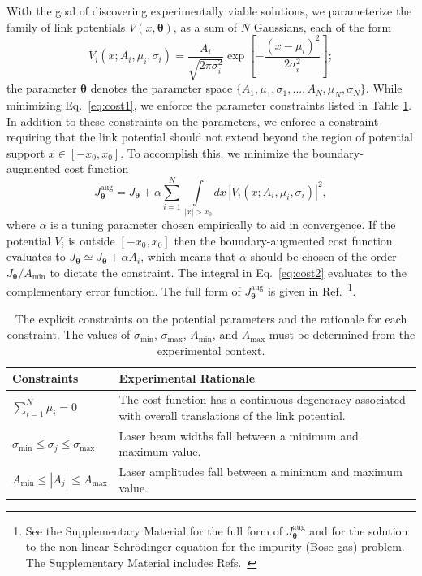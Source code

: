 \documentclass[twocolumn,amsmath,amssymb,showpacs,pra,superscriptaddress,aps]{revtex4-1}
\begin{document}
With the goal of discovering experimentally viable solutions, we parameterize the family of link potentials $V(x, \bm{\theta})$, as a sum of $N$ Gaussians, each of the form
\begin{equation}\label{eq:V-param}
V_i(x; A_i, \mu_i, \sigma_i) = \frac{A_i}{\sqrt{2\pi\sigma_i^2}}\exp\left[{-\frac{(x-\mu_i)^2}{2\sigma_i^2}}\right];
\end{equation}
the parameter $\bm{\theta}$ denotes the parameter space $\{A_1, \mu_1, \sigma_1,...,A_N, \mu_N, \sigma_N\}$. While minimizing Eq.~\eqref{eq:cost1}, we enforce the parameter constraints listed in Table \ref{tab:constraints}. In addition to these constraints on the parameters, we enforce a constraint requiring that the link potential should not extend beyond the region of potential support $x\in[-x_0,x_0]$. 
To accomplish this, we minimize the boundary-augmented cost function
\begin{equation}\label{eq:cost2}
  J_{\bm{\theta}}^{\mathrm{aug}} = J_{\bm{\theta}} + \alpha \sum_{i=1}^N\int\limits_{|x|>x_0}dx\,|V_i(x; A_i,\mu_i,\sigma_i)|^2,
\end{equation}
where $\alpha$ is a tuning parameter chosen empirically to aid in convergence. 
{\color{blue} If the potential $V_i$ is outside $[-x_0,x_0]$ then the boundary-augmented 
cost function evaluates to $J_{\bm{\theta}}\simeq J_{\bm{\theta}} +\alpha A_i$, which means that $\alpha$
should be chosen of the order $J_{\bm{\theta}}/A_{\mathrm{min}}$ to dictate the constraint.}
 The integral in Eq.~\eqref{eq:cost2} evaluates to the complementary error function. The full form of $J_{\bm{\theta}}^{\mathrm{aug}}$ is given in Ref.~\footnote{See the Supplementary Material for the full form of $J_{\bm{\theta}}^{\mathrm{aug}}$ and 
for the solution to the non-linear Schr{\"o}dinger equation for the impurity-(Bose gas) problem. The Supplementary Material includes Refs.~\cite{tsuzuki1971,ishikawa1980}}.

\begin{table}[t]
  \renewcommand*{\arraystretch}{1.4}
  \begin{tabular}{m{3cm}|m{5.5cm}}
    Constraints & Experimental Rationale \\
    \hline\hline
    $\sum_{i=1}^{N}\mu_i = 0$ & The cost function has a continuous degeneracy associated with overall translations of the link potential. \\
    \hline
    $\sigma_{\mathrm{min}} \leq \sigma_j \leq \sigma_{\mathrm{max}} $ & Laser beam widths fall between a minimum and maximum value.\\
    \hline
    $A_{\mathrm{min}} \leq |A_j| \leq A_{\mathrm{max}}$ & Laser amplitudes fall between a minimum and maximum value.
  \end{tabular}
  \caption{The explicit constraints on the potential parameters and the rationale for each constraint. The values of $\sigma_{\mathrm{min}}$, $\sigma_{\mathrm{max}}$, $A_{\mathrm{min}}$, and $A_{\mathrm{max}}$ must be determined from the experimental context.}
  \label{tab:constraints}
\end{table}
\end{document}
